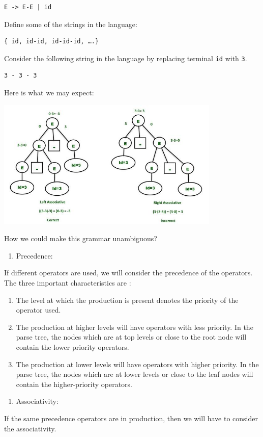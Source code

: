 \documentclass[11pt]{article}
\begin{document}
\begin{verbatim}
E -> E-E | id
\end{verbatim}

Define some of the strings in the language:

\begin{verbatim}
{ id, id-id, id-id-id, ….}
\end{verbatim}


Consider the following string in the language by replacing terminal \texttt{id} with
\texttt{3}.

\begin{verbatim}
3 - 3 - 3 
\end{verbatim}


Here is what we may expect:


\begin{center}
\includegraphics[width=0.8\textwidth]{./figures/grammertree1.jpeg}
\label{fig4}
\end{center}


How we could make this grammar unambiguous?


\begin{enumerate}
\item Precedence:
\end{enumerate}
If different operators are used, we will consider the precedence of the
operators. The three important characteristics are :

\begin{enumerate}
\item The level at which the production is present denotes the priority of the
operator used.
\item The production at higher levels will have operators with less priority. In
the parse tree, the nodes which are at top levels or close to the root
node will contain the lower priority operators.
\item The production at lower levels will have operators with higher priority.
In the parse tree, the nodes which are at lower levels or close to the
leaf nodes will contain the higher-priority operators.
\end{enumerate}
\begin{enumerate}
\item Associativity:
\end{enumerate}
If the same precedence operators are in production, then we will have to
consider the associativity.
\end{document}
